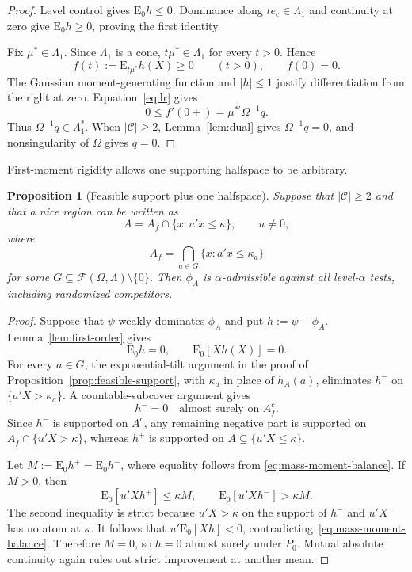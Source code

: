 \documentclass[12pt]{article}
\newtheorem{proposition}[theorem]{Proposition}
\theoremstyle{definition}
\theoremstyle{remark}
\newcommand{\E}{\mathrm E}
\newcommand{\cC}{\mathcal C}
\newcommand{\cF}{\mathcal F}
\newcommand{\1}{\mathbf 1}
\begin{document}
\begin{proof}
Level control gives $\E_0h\le0$.  Dominance along $te_c\in\Lambda_1$
and continuity at zero give $\E_0h\ge0$, proving the first identity.

Fix $\mu^*\in\Lambda_1$.  Since $\Lambda_1$ is a cone,
$t\mu^*\in\Lambda_1$ for every $t>0$.  Hence
\[
f(t):=\E_{t\mu^*}h(X)\ge0
\qquad(t>0),
\qquad f(0)=0.
\]
The Gaussian moment-generating function and $|h|\le1$ justify
differentiation from the right at zero.  Equation~\eqref{eq:lr} gives
\[
0\le f'(0+)
=\mu^{*\prime}\Omega^{-1}q.
\]
Thus $\Omega^{-1}q\in\Lambda_1^*$.  When $|\cC|\ge2$,
Lemma~\ref{lem:dual} gives $\Omega^{-1}q=0$, and nonsingularity of
$\Omega$ gives $q=0$.
\end{proof}

First-moment rigidity allows one supporting halfspace to be arbitrary.

\begin{proposition}[Feasible support plus one halfspace]
\label{prop:one-extra}
Suppose that $|\cC|\ge2$ and that a nice region can be written as
\begin{equation}\label{eq:one-extra-representation}
A=A_f\cap\{x:u'x\le\kappa\},
\qquad u\ne0,
\end{equation}
where
\[
A_f
=
\bigcap_{a\in G}\{x:a'x\le\kappa_a\}
\]
for some $G\subseteq\cF(\Omega,\Lambda)\setminus\{0\}$.  Then
$\phi_A$ is $\alpha$-admissible against all level-$\alpha$ tests,
including randomized competitors.
\end{proposition}

\begin{proof}
Suppose that $\psi$ weakly dominates $\phi_A$ and put
$h:=\psi-\phi_A$.  Lemma~\ref{lem:first-order} gives
\begin{equation}\label{eq:mass-moment-balance}
\E_0h=0,
\qquad
\E_0[Xh(X)]=0.
\end{equation}
For every $a\in G$, the exponential-tilt argument in the proof of
Proposition~\ref{prop:feasible-support}, with $\kappa_a$ in place of
$h_A(a)$, eliminates $h^-$ on $\{a'X>\kappa_a\}$.  A countable-subcover
argument gives
\[
h^-=0\quad\text{almost surely on }A_f^c.
\]
Since $h^-$ is supported on $A^c$, any remaining negative part is supported
on $A_f\cap\{u'X>\kappa\}$, whereas $h^+$ is supported on
$A\subseteq\{u'X\le\kappa\}$.

Let $M:=\E_0h^+=\E_0h^-$, where equality follows from
\eqref{eq:mass-moment-balance}.  If $M>0$, then
\[
\E_0[u'Xh^+]\le\kappa M,
\qquad
\E_0[u'Xh^-]>\kappa M.
\]
The second inequality is strict because $u'X>\kappa$ on the support of
$h^-$ and $u'X$ has no atom at $\kappa$.  It follows that
$u'\E_0[Xh]<0$, contradicting~\eqref{eq:mass-moment-balance}.  Therefore
$M=0$, so $h=0$ almost surely under $P_0$.  Mutual absolute continuity
again rules out strict improvement at another mean.
\end{proof}
\end{document}
